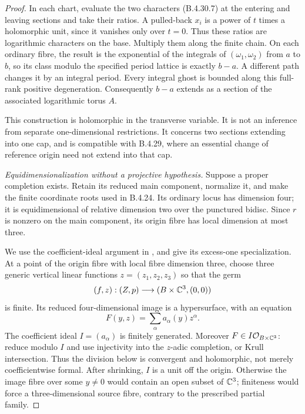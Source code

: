 \begin{proof}
In each chart, evaluate the two characters
(B.4.30.7) at the entering and leaving sections
and take their ratios. A pulled-back $x_i$
is a power of $t$ times a holomorphic unit,
since it vanishes only over $t=0$. Thus these
ratios are logarithmic characters on the base.
Multiply them along the finite chain. On each
ordinary fibre, the result is the exponential
of the integrals of $(\omega_1,\omega_2)$ from
$a$ to $b$, so its class modulo the specified
period lattice is exactly $b-a$. A different
path changes it by an integral period. Every
integral ghost is bounded along this full-rank
positive degeneration. Consequently $b-a$
extends as a section of the associated
logarithmic torus $A$.

This construction is holomorphic in the
transverse variable. It is not an inference
from separate one-dimensional restrictions.
It concerns two sections extending into one
cap, and is compatible with B.4.29, where an
essential change of reference origin need not
extend into that cap.

\emph{Equidimensionalization without a projective hypothesis.}
Suppose a proper completion exists. Retain its
reduced main component, normalize it, and make
the finite coordinate roots used in B.4.24.
Its ordinary locus has dimension four; it is
equidimensional of relative dimension two
over the punctured bidisc. Since $r$ is
nonzero on the main component, its origin
fibre has local dimension at most three.

We use the coefficient-ideal argument in
\citet[Corollary 1.2 and its proof,
manuscript pp.~3--5]{Parusinski1990E}, and give
its excess-one specialization. At a point of
the origin fibre with local fibre dimension
three, choose three generic vertical linear
functions $z=(z_1,z_2,z_3)$ so that the germ
\[
 (f,z): (Z,p)\longrightarrow(B\times\mathbb C^3,(0,0))
\]
is finite. Its reduced four-dimensional image
is a hypersurface, with an equation
\[
 F(y,z)=\sum_\alpha a_\alpha(y)z^\alpha.
 \tag{B.4.30.8}
\]
The coefficient ideal $I=(a_\alpha)$ is finitely
generated. Moreover $F\in I\mathcal O_{B\times\mathbb C^3}$:
reduce modulo $I$ and use injectivity into
the $z$-adic completion, or Krull intersection.
Thus the division below is convergent and
holomorphic, not merely coefficientwise formal.
After shrinking, $I$ is a unit off the origin. Otherwise the image fibre over
some $y\ne0$ would contain an open subset of
$\mathbb C^3$; finiteness would force a
three-dimensional source fibre, contrary to
the prescribed partial family.


\end{proof}
